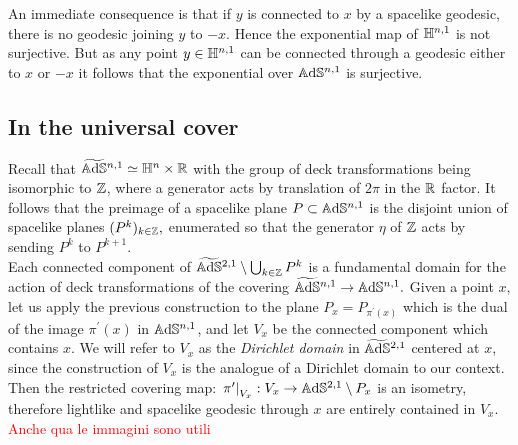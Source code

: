 An immediate consequence is that if $y$ is connected to $x$ by a spacelike geodesic, there is no geodesic joining $y$ to $-x$. Hence the exponential map of $\mathbb{H}^{n,1}$ is not surjective. But as any point $y\in\mathbb{H}^{n,1}$ can be connected through a geodesic either to $x$ or $-x$ it follows that the exponential over $\mathbb{A}\mathrm{d}\mathbb{S}^{n,1}$ is surjective.
\subsection{In the universal cover}
Recall that $\widetilde{\mathbb{A}\mathrm{d}\mathbb{S}}{}^{n,1}\simeq \mathbb{H}^n\times\mathbb{R}$ with the group of deck transformations being isomorphic to $\mathbb{Z}$, where a generator acts by translation of $2\pi$ in the $\mathbb{R}$ factor. It follows that the preimage of a spacelike plane $P\subset\mathbb{A}\mathrm{d}\mathbb{S}^{n,1}$ is the disjoint union of spacelike planes $(P^k)_{k\in\mathbb{Z}},$ enumerated so that the generator $\eta$ of $\mathbb{Z}$ acts by sending $P^k$ to $P^{k+1}.$ \\
Each connected component of $\widetilde{\mathbb{A}\mathrm{d}\mathbb{S}}{}^{2,1}\setminus\bigcup_{k\in\mathbb{Z}} P^k$ is a fundamental domain for the action of deck transformations of the covering $\widetilde{\mathbb{A}\mathrm{d}\mathbb{S}}{}^{n,1}\to\mathbb{A}\mathrm{d}\mathbb{S}^{n,1}.$ Given a point $x$, let us apply the previous construction to the plane $P_x=P_{\pi^{\prime}(x)}$ which is the dual of the image $\pi^{\prime}(x)$ in $\mathbb{A}\mathrm{d}\mathbb{S}^{n,1}$, and let $V_x$ be the connected component which contains $x$. We will refer to $V_x$ as the \textit{Dirichlet domain} in $\widetilde{\mathbb{A}\mathrm{d}\mathbb{S}}{}^{2,1}$ centered at $x$, since the construction of $V_x$ is the analogue of a Dirichlet domain to our context. Then the restricted covering map: $\left.\pi^{\prime}\right|_{V_x}:V_x\to\mathbb{A}\mathrm{d}\mathbb{S}^{2,1}\setminus P_x$ is an isometry, therefore lightlike and spacelike geodesic through $x$ are entirely contained in $V_x$.\\ 

\textcolor{red}{Anche qua le immagini sono utili }